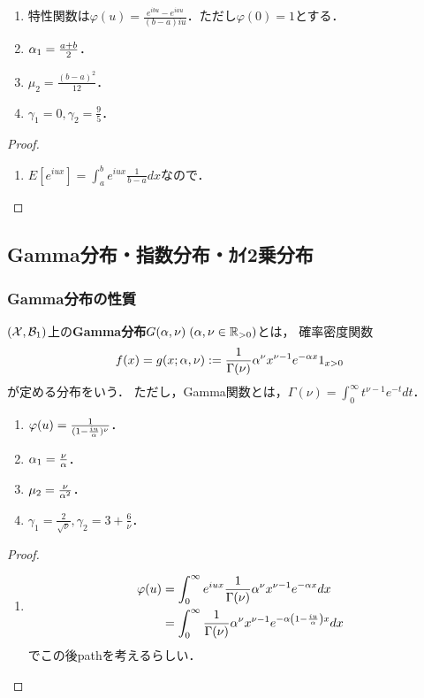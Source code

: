 \documentclass[uplatex,dvipdfmx]{jsreport}
\begin{document}
\begin{proposition}\mbox{}
    \begin{enumerate}
        \item 特性関数は$\varphi(u)=\frac{e^{ibu}-e^{iau}}{(b-a)iu}$．ただし$\varphi(0)=1$とする．
        \item $\alpha_1=\frac{a+b}{2}$．
        \item $\mu_2=\frac{(b-a)^2}{12}$．
        \item $\gamma_1=0,\gamma_2=\frac{9}{5}$．
    \end{enumerate}
\end{proposition}
\begin{proof}\mbox{}
    \begin{enumerate}
        \item $E[e^{iux}]=\int^b_ae^{iux}\frac{1}{b-a}dx$なので．
    \end{enumerate}
\end{proof}

\subsection{Gamma分布・指数分布・ｶｲ2乗分布}

\subsubsection{Gamma分布の性質}

\begin{definition}
    $(\mathcal{X},\mathcal{B}_1)$上の\textbf{Gamma分布}$G(\alpha,\nu)\;(\alpha,\nu\in\mathbb{R}_{>0})$とは，
    確率密度関数
    \[f(x)=g(x;\alpha,\nu):=\frac{1}{\Gamma(\nu)}\alpha^\nu x^{\nu-1}e^{-\alpha x}1_{x>0}\]
    が定める分布をいう．
    ただし，Gamma関数とは，$\Gamma(\nu)=\int^\infty_0t^{\nu-1}e^{-t}dt$．
\end{definition}

\begin{proposition}\mbox{}
    \begin{enumerate}
        \item $\varphi(u)=\frac{1}{(1-\frac{iu}{\alpha})^\nu}$．
        \item $\alpha_1=\frac{\nu}{\alpha}$．
        \item $\mu_2=\frac{\nu}{\alpha^2}$．
        \item $\gamma_1=\frac{2}{\sqrt{\nu}},\gamma_2=3+\frac{6}{\nu}$．
    \end{enumerate}
\end{proposition}
\begin{proof}\mbox{}
    \begin{enumerate}
        \item \begin{align*}
            \varphi(u)&=\int^\infty_0e^{iux}\frac{1}{\Gamma(\nu)}\alpha^\nu x^{\nu-1}e^{-\alpha x}dx\\
            &=\int^\infty_0\frac{1}{\Gamma(\nu)}\alpha^\nu x^{\nu-1}e^{-\alpha\left(1-\frac{iu}{\alpha}\right)x}dx
        \end{align*}
        でこの後pathを考えるらしい．
    \end{enumerate}
\end{proof}
\end{document}
